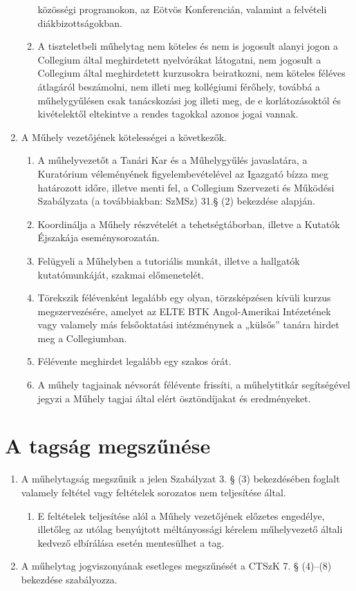 \documentclass{../styles/rulebook}
\begin{document}
\begin{enumerate}
\begin{enumerate}
		közösségi programokon, az Eötvös Konferencián, valamint a felvételi
		diákbizottságokban.
		\item A tiszteletbeli műhelytag nem köteles és nem is jogosult alanyi jogon a
		Collegium által meghirdetett nyelvórákat látogatni, nem jogosult a Collegium által
		meghirdetett kurzusokra beiratkozni, nem köteles féléves átlagáról beszámolni,
		nem illeti meg kollégiumi férőhely, továbbá a műhelygyűlésen csak tanácskozási
		jog illeti meg, de e korlátozásoktól és kivételektől eltekintve a rendes tagokkal
		azonos jogai vannak.
	\end{enumerate}
	\item A Műhely vezetőjének kötelességei a következők.
	\begin{enumerate}
		\item A műhelyvezetőt a Tanári Kar és a Műhelygyűlés javaslatára, a Kuratórium
		véleményének figyelembevételével az Igazgató bízza meg határozott időre, illetve menti fel, a Collegium Szervezeti és Működési
		Szabályzata (a továbbiakban: SzMSz) 31.§ (2) bekezdése alapján.
		\item Koordinálja a Műhely részvételét a tehetségtáborban, illetve a Kutatók Éjszakája
		eseménysorozatán.
		\item Felügyeli a Műhelyben a tutoriális munkát, illetve a hallgatók kutatómunkáját,	szakmai előmenetelét.
		\item Törekszik félévenként legalább egy olyan, törzsképzésen kívüli kurzus	megszervezésére, amelyet az ELTE BTK Angol-Amerikai Intézetének vagy
		valamely más felsőoktatási intézménynek a „külsős” tanára hirdet meg a	Collegiumban.
		\item Félévente meghirdet legalább egy szakos órát.
		\item A műhely tagjainak névsorát félévente frissíti, a műhelytitkár segítségével jegyzi a Műhely tagjai által elért ösztöndíjakat és eredményeket. 
	\end{enumerate}
\end{enumerate}


\section{A tagság megszűnése}

\begin{enumerate}
	\item A műhelytagság megszűnik a jelen Szabályzat 3. § (3) bekezdésében foglalt valamely
	feltétel vagy feltételek sorozatos nem teljesítése által.
	\begin{enumerate}
		\item E feltételek teljesítése alól a Műhely vezetőjének előzetes engedélye, illetőleg az
		utólag benyújtott méltányossági kérelem műhelyvezető általi kedvező elbírálása esetén mentesülhet a tag.
	\end{enumerate}
	\item A műhelytag jogviszonyának esetleges megszűnését a CTSzK 7. § (4)--(8) bekezdése szabályozza.
\end{enumerate}
\end{document}
